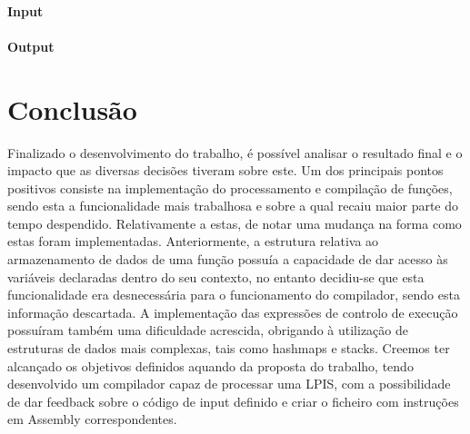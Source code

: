 \documentclass[a4paper,10pt]{report}
\begin{document}
\subsubsection{Input}

\subsubsection{Output}



\chapter{Conclusão}
\label{cap:intro}

Finalizado o desenvolvimento do trabalho, é possível analisar o resultado final e o impacto que as diversas decisões tiveram sobre este. Um dos principais pontos positivos consiste na implementação do processamento e compilação de funções, sendo esta a funcionalidade mais trabalhosa e sobre a qual recaiu maior parte do tempo despendido. Relativamente a estas, de notar uma mudança na forma como estas foram implementadas. Anteriormente, a estrutura relativa ao armazenamento de dados de uma função possuía a capacidade de dar acesso às variáveis declaradas dentro do seu contexto, no entanto decidiu-se que esta funcionalidade era desnecessária para o funcionamento do compilador, sendo esta informação descartada. A implementação das expressões de controlo de execução possuíram também uma dificuldade acrescida, obrigando à utilização de estruturas de dados mais complexas, tais como hashmaps e stacks. Creemos ter alcançado os objetivos definidos aquando da proposta do trabalho, tendo desenvolvido um compilador capaz de processar uma LPIS, com a possibilidade de dar feedback sobre o código de input definido e criar o ficheiro com instruções em Assembly correspondentes.
\end{document}
